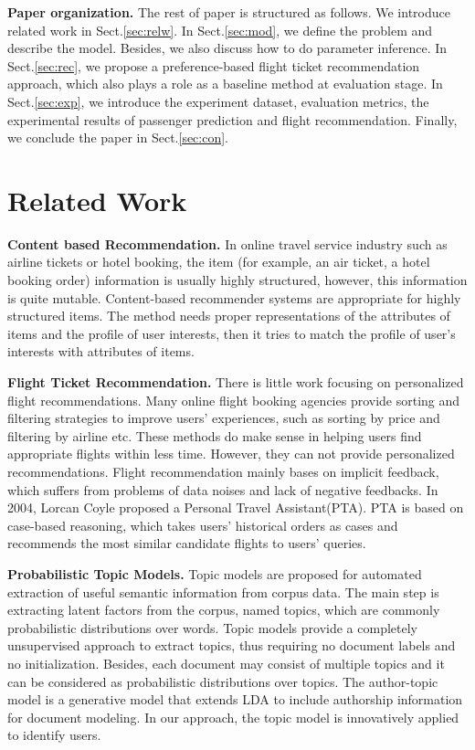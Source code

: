 \documentclass{llncs}
\begin{document}
\textbf{Paper organization.} The rest of paper is structured as follows. We introduce related work in Sect.\ref{sec:relw}. In Sect.\ref{sec:mod}, we define the problem and describe the model. Besides, we also discuss how to do parameter inference. In Sect.\ref{sec:rec}, we propose a preference-based flight ticket recommendation approach, which also plays a role as a baseline method at evaluation stage. In Sect.\ref{sec:exp}, we introduce the experiment dataset, evaluation metrics, the experimental results of passenger prediction and flight recommendation. Finally, we conclude the paper in Sect.\ref{sec:con}.

\section{Related Work}\par
\label{sec:relw}
\textbf{Content based Recommendation.} In online travel service industry such as airline tickets or hotel booking, the item (for example, an air ticket, a hotel booking order) information is usually highly structured, however, this information is quite mutable. Content-based recommender systems \cite{tech:cset}\cite{lops:handbook}are appropriate for highly structured items. The method needs proper representations of the attributes of items and the profile of user interests, then it tries to match the profile of user's interests with attributes of items.\par
\textbf{Flight Ticket Recommendation.} There is little work focusing on personalized flight  recommendations. Many online flight booking agencies provide sorting and filtering strategies to improve users' experiences, such as sorting by price and filtering by airline etc. These methods do make sense in helping users find appropriate flights within less time. However, they can not provide personalized recommendations. Flight recommendation mainly bases on implicit feedback\cite{song:mining}, which suffers from problems of data noises and lack of negative feedbacks. In 2004, Lorcan Coyle\cite{lor:flight} proposed a Personal Travel Assistant(PTA). PTA is based on case-based reasoning, which takes users' historical orders as cases and recommends the most similar candidate flights to users' queries.\par

\textbf{Probabilistic Topic Models.}  Topic models\cite{blei:lda}\cite{mic:atm}\cite{mark:prob} are proposed for automated extraction of useful semantic information from corpus data. The main step is extracting latent factors from the corpus, named topics, which are commonly probabilistic distributions over words. Topic models provide a completely unsupervised approach to extract topics, thus requiring no document labels and no initialization. Besides, each document may consist of multiple topics and it can be considered as probabilistic distributions over topics. The author-topic model is a generative model that extends LDA to include authorship information for document modeling. In our approach, the topic model is innovatively applied to identify users. \par
\end{document}
